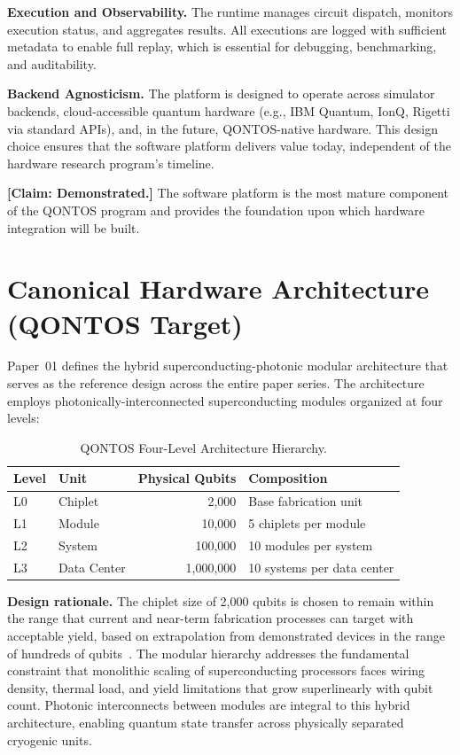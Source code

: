 \documentclass[conference]{IEEEtran}
\begin{document}
\textbf{Execution and Observability.} The runtime manages circuit dispatch, monitors execution status, and aggregates results. All executions are logged with sufficient metadata to enable full replay, which is essential for debugging, benchmarking, and auditability.

\textbf{Backend Agnosticism.} The platform is designed to operate across simulator backends, cloud-accessible quantum hardware (e.g., IBM Quantum, IonQ, Rigetti via standard APIs), and, in the future, QONTOS-native hardware. This design choice ensures that the software platform delivers value today, independent of the hardware research program's timeline.

\textbf{[Claim: Demonstrated.]} The software platform is the most mature component of the QONTOS program and provides the foundation upon which hardware integration will be built.

\section{Canonical Hardware Architecture (QONTOS Target)}

Paper~01 defines the hybrid superconducting-photonic modular architecture that serves as the reference design across the entire paper series. The architecture employs photonically-interconnected superconducting modules organized at four levels:

\begin{table}[htbp]
\centering
\caption{QONTOS Four-Level Architecture Hierarchy.}
\label{tab:arch_hierarchy}
\begin{tabular}{llrl}
\toprule
\textbf{Level} & \textbf{Unit} & \textbf{Physical Qubits} & \textbf{Composition} \\
\midrule
L0 & Chiplet    & 2,000     & Base fabrication unit \\
L1 & Module     & 10,000    & 5 chiplets per module \\
L2 & System     & 100,000   & 10 modules per system \\
L3 & Data Center & 1,000,000 & 10 systems per data center \\
\bottomrule
\end{tabular}
\end{table}

\textbf{Design rationale.} The chiplet size of 2,000 qubits is chosen to remain within the range that current and near-term fabrication processes can target with acceptable yield, based on extrapolation from demonstrated devices in the range of hundreds of qubits~\cite{arute2019, kim2023, ibm2024}. The modular hierarchy addresses the fundamental constraint that monolithic scaling of superconducting processors faces wiring density, thermal load, and yield limitations that grow superlinearly with qubit count. Photonic interconnects between modules are integral to this hybrid architecture, enabling quantum state transfer across physically separated cryogenic units.
\end{document}
